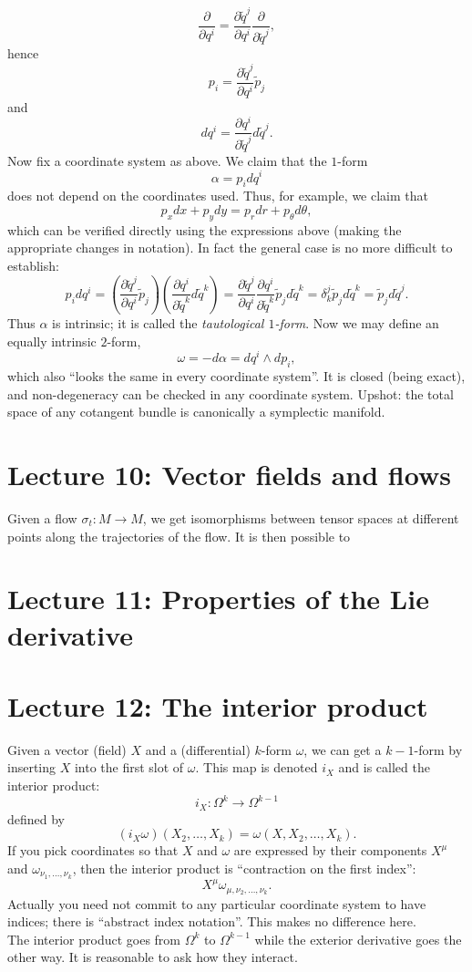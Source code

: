 \documentclass[11pt]{article} %
\begin{document}
$$
\frac{\partial }{\partial q^i} = \frac{\partial \tilde{q}^j}{\partial q^i}\frac{\partial }{\partial \tilde{q}^j},
$$
hence
$$
p_i = \frac{\partial \tilde{q}^j}{\partial q^i} \tilde{p}_j
$$
and
$$
dq^i = \frac{\partial q^i}{\partial \tilde{q}^j} d\tilde{q}^j.
$$
Now fix a coordinate system as above. We claim that the $1$-form 
$$
\alpha = p_i dq^i
$$
does not depend on the coordinates used. Thus, for example, we claim that
$$
p_x dx + p_ydy = p_r dr + p_\theta d\theta,
$$
which can be verified directly using the expressions above (making the appropriate changes in notation). In fact the general case is no more difficult to establish:
$$
p_i dq^i = \left(\frac{\partial \tilde{q}^j}{\partial q^i} \tilde{p}_j \right) \left( \frac{\partial q^i}{\partial \tilde{q}^k} d\tilde{q}^k\right) = \frac{\partial \tilde{q}^j}{\partial q^i} \frac{\partial q^i}{\partial \tilde{q}^k} \tilde{p}_j  d\tilde{q}^k = \delta ^j_k \tilde{p}_j  d\tilde{q}^k = \tilde{p}_j  d\tilde{q}^j.
$$
Thus $\alpha$ is intrinsic; it is called the \emph{tautological $1$-form}. Now we may define an equally intrinsic $2$-form,
$$
\omega = -d\alpha = dq^i \wedge dp_i,
$$
which also ``looks the same in every coordinate system''. It is closed (being exact), and non-degeneracy can be checked in any coordinate system. Upshot: the total space of any cotangent bundle is canonically a symplectic manifold. 
\section*{Lecture 10: Vector fields and flows}


Given a flow $\sigma_t: M\rightarrow M$, we get isomorphisms between tensor spaces at different points along the trajectories of the flow. It is then possible to 
\section*{Lecture 11: Properties of the Lie derivative}

\section*{Lecture 12: The interior product}
Given a vector (field) $X$ and a (differential) $k$-form $\omega$, we can get a $k-1$-form by inserting $X$ into the first slot of $\omega$. This map is denoted $i_X$ and is called the interior product:
$$
i_X: \Omega^k \rightarrow \Omega^{k-1}
$$
defined by 
$$
(i_X\omega)(X_2, \dots, X_k)= \omega(X, X_2, \dots, X_k).
$$
If you pick coordinates so that $X$ and $\omega$ are expressed by their components $X^\mu$ and $\omega_{\nu_1, \dots, \nu_k}$, then the interior product is ``contraction on the first index'':
$$
X^\mu \omega_{\mu, \nu_2, \dots, \nu_k}.
$$
Actually you need not commit to any particular coordinate system to have indices; there is ``abstract index notation''. This makes no difference here. \\
The interior product goes from $\Omega^k$ to $\Omega^{k-1}$ while the exterior derivative goes the other way. It is reasonable to ask how they interact. 
\end{document}
